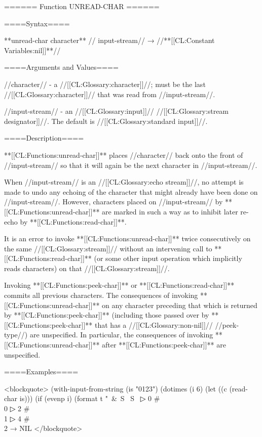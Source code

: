 ====== Function UNREAD-CHAR ======

====Syntax====

**{unread-char} {character** //\opt} input-stream// → //**[[CL:Constant Variables:nil]]**//

====Arguments and Values====

//character// - a //[[CL:Glossary:character]]//; must be the last //[[CL:Glossary:character]]// that was read from //input-stream//.

//input-stream// - an //[[CL:Glossary:input]]// //[[CL:Glossary:stream designator]]//. The default is //[[CL:Glossary:standard input]]//.

====Description====

**[[CL:Functions:unread-char]]** places //character// back onto the front of //input-stream// so that it will again be the next character in //input-stream//.

When //input-stream// is an //[[CL:Glossary:echo stream]]//, no attempt is made to undo any echoing of the character that might already have been done on //input-stream//. However, characters placed on //input-stream// by **[[CL:Functions:unread-char]]** are marked in such a way as to inhibit later re-echo by **[[CL:Functions:read-char]]**.

It is an error to invoke **[[CL:Functions:unread-char]]** twice consecutively on the same //[[CL:Glossary:stream]]// without an intervening call to **[[CL:Functions:read-char]]** (or some other input operation which implicitly reads characters) on that //[[CL:Glossary:stream]]//.

Invoking **[[CL:Functions:peek-char]]** or **[[CL:Functions:read-char]]** commits all previous characters. The consequences of invoking **[[CL:Functions:unread-char]]** on any character preceding that which is returned by **[[CL:Functions:peek-char]]** (including those passed over by **[[CL:Functions:peek-char]]** that has a //[[CL:Glossary:non-nil]]// //peek-type//) are unspecified. In particular, the consequences of invoking **[[CL:Functions:unread-char]]** after **[[CL:Functions:peek-char]]** are unspecified.

====Examples====

<blockquote> (with-input-from-string (is "0123") (dotimes (i 6) (let ((c (read-char is))) (if (evenp i) (format t "~&~S ~S~
▷ 0 #\\0
▷ 2 #\\1
▷ 4 #\\2 → NIL </blockquote>

